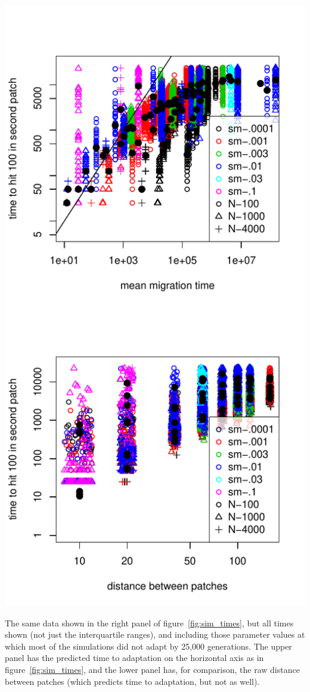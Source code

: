 \documentclass{article}
\begin{document}
\begin{sfigure}
  \begin{center}
    \includegraphics{migration-time-predicted}
  \end{center}
  \caption{
    The same data shown in the right panel of figure~\ref{fig:sim_times},
    but all times shown (not just the interquartile ranges),
    and including those parameter values at which most of the simulations did not adapt by 25,000 generations.
    The upper panel has the predicted time to adaptation on the horizontal axis as in figure~\ref{fig:sim_times},
    and the lower panel has, for comparison, the raw distance between patches 
    (which predicts time to adaptation, but not as well).
  } \label{sfig:sim_mutation_times}
\end{sfigure}
\end{document}
